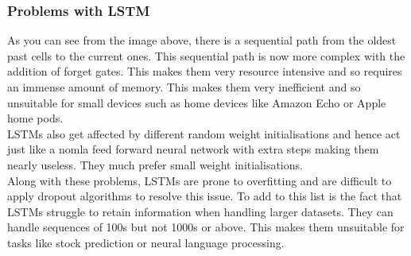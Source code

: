\documentclass{article}
\begin{document}
\subsubsection{Problems with LSTM}
As you can see from the image above, there is a sequential path from the oldest past cells to the
current ones. This sequential path is now more complex with the addition of forget gates. This
makes them very resource intensive and so requires an immense amount of memory. This makes
them very inefficient and so unsuitable for small devices such as home devices like Amazon
Echo or Apple home pods.\\
LSTMs also get affected by different random weight initialisations and hence act just like a nomla
feed forward neural network with extra steps making them nearly useless. They much prefer
small weight initialisations.\\
Along with these problems, LSTMs are prone to overfitting and are difficult to apply dropout
algorithms to resolve this issue. To add to this list is the fact that LSTMs struggle to retain
information when handling larger datasets. They can handle sequences of 100s but not 1000s or above. This makes them unsuitable for tasks like stock prediction or neural language processing.
\end{document}
